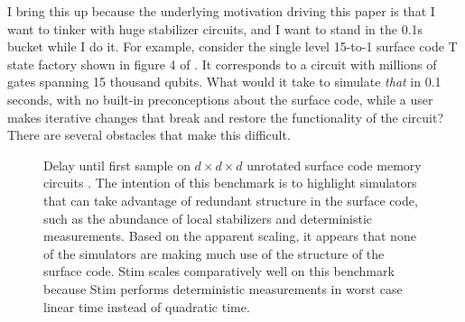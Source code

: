 \documentclass[onecolumn,unpublished]{quantumarticle}
\theoremstyle{definition}
\theoremstyle{definition}
\theoremstyle{definition}
\begin{document}
I bring this up because the underlying motivation driving this paper is that I want to tinker with huge stabilizer circuits, and I want to stand in the 0.1s bucket while I do it.
For example, consider the single level 15-to-1 surface code T state factory shown in figure 4 of \cite{gidney2019catalyzeddistillation}.
It corresponds to a circuit with millions of gates spanning 15 thousand qubits.
What would it take to simulate {\em that} in 0.1 seconds, with no built-in preconceptions about the surface code, while a user makes iterative changes that break and restore the functionality of the circuit?
There are several obstacles that make this difficult.

\begin{figure}
    \centering
    \caption{
        Delay until first sample on $d \times d \times d$ unrotated surface code memory circuits \cite{horsman2012latticesurgery}.
        The intention of this benchmark is to highlight simulators that can take advantage of redundant structure in the surface code, such as the abundance of local stabilizers and deterministic measurements.
        Based on the apparent scaling, it appears that none of the simulators are making much use of the structure of the surface code.
        Stim scales comparatively well on this benchmark because Stim performs deterministic measurements in worst case linear time instead of quadratic time.
    }
    \label{fig:bench-surface}
\end{figure}
\end{document}
